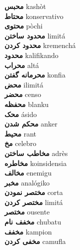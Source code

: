 \textbf{ محبس  } kashòt \\
\textbf{ محتاط  } konservativo \\
\textbf{ محتوی  } pòchi \\
\textbf{ محدود ساختن  } limitá \\
\textbf{ محدود کردن  } kremenchá \\
\textbf{ محدود  } kalifikando \\
\textbf{ محراب  } altá \\
\textbf{ محرمانه گفتن  } konfia \\
\textbf{ محض  } ilimitá \\
\textbf{ محضر  } censo \\
\textbf{ محفظه  } blanku \\
\textbf{ محک  } ásido \\
\textbf{ محکم شدن  } anker \\
\textbf{ محیط  } rant \\
\textbf{ مخ  } celebro \\
\textbf{ مخاطب ساختن  } adrès \\
\textbf{ مخاطره  } koinsidensia \\
\textbf{ مخالف  } enemigu \\
\textbf{ مخبر  } analógiko \\
\textbf{ مختصر نمودن  } corta \\
\textbf{ مختصر کردن  } limitá \\
\textbf{ مختصر  } ousente \\
\textbf{ مخفف نام  } chubatu \\
\textbf{ مخفف  } kampion \\
\textbf{ مخفی کردن  } camufla \\
